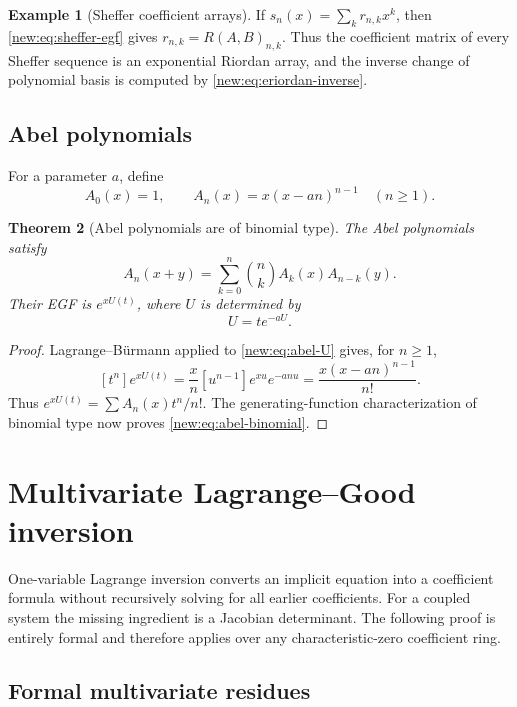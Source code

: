 \documentclass[11pt,a4paper,oneside,openany]{book}
\newtheorem{theorem}{Theorem}[chapter]
\theoremstyle{definition}
\newtheorem{example}[theorem]{Example}
\theoremstyle{remark}
\begin{document}
\begin{example}[Sheffer coefficient arrays]
If $s_n(x)=\sum_k r_{n,k}x^k$, then
\eqref{new:eq:sheffer-egf} gives
$r_{n,k}=R(A,B)_{n,k}$.  Thus the coefficient matrix of every Sheffer sequence
is an exponential Riordan array, and the inverse change of polynomial basis is
computed by \eqref{new:eq:eriordan-inverse}.
\end{example}

\section{Abel polynomials}

For a parameter $a$, define
\[
 A_0(x)=1,\qquad A_n(x)=x(x-an)^{n-1}\quad(n\ge1).
\]

\begin{theorem}[Abel polynomials are of binomial type]
The Abel polynomials satisfy
\begin{equation}
 A_n(x+y)=\sum_{k=0}^n\binom nk A_k(x)A_{n-k}(y).
 \label{new:eq:abel-binomial}
\end{equation}
Their EGF is $e^{xU(t)}$, where $U$ is determined by
\begin{equation}
 U=t e^{-aU}.
 \label{new:eq:abel-U}
\end{equation}
\end{theorem}

\begin{proof}
Lagrange--B\"urmann applied to \eqref{new:eq:abel-U} gives, for $n\ge1$,
\[
 [t^n]e^{xU(t)}
 =\frac{x}{n}[u^{n-1}]e^{xu}e^{-anu}
 =\frac{x(x-an)^{n-1}}{n!}.
\]
Thus $e^{xU(t)}=\sum A_n(x)t^n/n!$.  The generating-function
characterization of binomial type now proves \eqref{new:eq:abel-binomial}.
\end{proof}

\chapter{Multivariate Lagrange--Good inversion}
\label{ch:good-inversion}

One-variable Lagrange inversion converts an implicit equation into a coefficient
formula without recursively solving for all earlier coefficients.  For a coupled
system the missing ingredient is a Jacobian determinant.  The following proof is
entirely formal and therefore applies over any characteristic-zero coefficient
ring.

\section{Formal multivariate residues}
\end{document}
